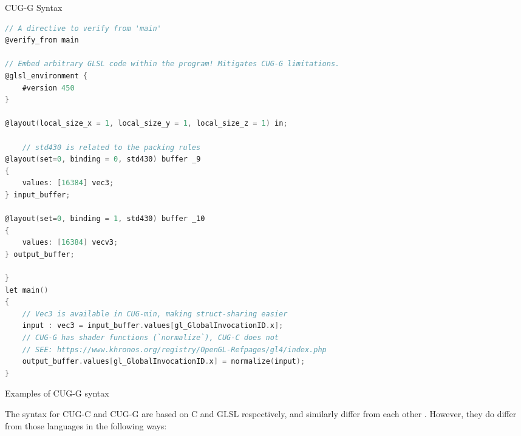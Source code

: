 \documentclass[a4paper,12pt,twoside,openright]{report}
\begin{document}
\begin{lstfloat}
\begin{center} CUG-G Syntax\end{center}
\begin{lstlisting}[language=C]
// A directive to verify from 'main'
@verify_from main

// Embed arbitrary GLSL code within the program! Mitigates CUG-G limitations.
@glsl_environment {
    #version 450
}

@layout(local_size_x = 1, local_size_y = 1, local_size_z = 1) in;

    // std430 is related to the packing rules
@layout(set=0, binding = 0, std430) buffer _9
{
    values: [16384] vec3;
} input_buffer;

@layout(set=0, binding = 1, std430) buffer _10
{
    values: [16384] vecv3;
} output_buffer;

}
let main()
{
    // Vec3 is available in CUG-min, making struct-sharing easier
    input : vec3 = input_buffer.values[gl_GlobalInvocationID.x];
    // CUG-G has shader functions (`normalize`), CUG-C does not
    // SEE: https://www.khronos.org/registry/OpenGL-Refpages/gl4/index.php
    output_buffer.values[gl_GlobalInvocationID.x] = normalize(input);
}
\end{lstlisting}
\caption{Examples of CUG-G syntax}
\label{lst:cug_g_syntax}
\end{lstfloat}


The syntax for CUG-C and CUG-G are based on C and GLSL respectively, and
similarly differ from each other \cite{MissingInGLSL}. However, they do differ
from those languages in the following ways:
\end{document}
